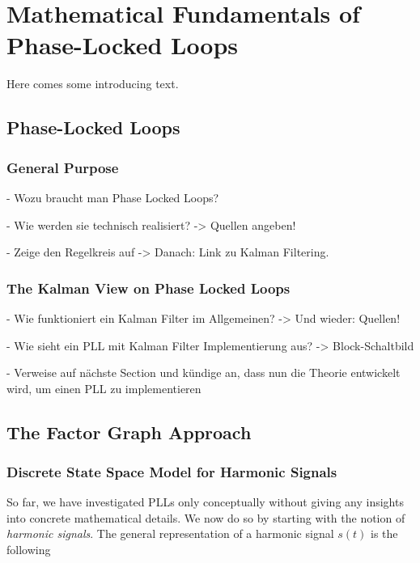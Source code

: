 \chapter{Mathematical Fundamentals of Phase-Locked Loops}

Here comes some introducing text.

\section{Phase-Locked Loops}

\subsection{General Purpose}

- Wozu braucht man Phase Locked Loops?

\noindent - Wie werden sie technisch realisiert? -> Quellen angeben!

\noindent - Zeige den Regelkreis auf -> Danach: Link zu Kalman Filtering.

\subsection{The Kalman View on Phase Locked Loops}

- Wie funktioniert ein Kalman Filter im Allgemeinen? -> Und wieder: Quellen!

\noindent - Wie sieht ein PLL mit Kalman Filter Implementierung aus? -> Block-Schaltbild

\noindent - Verweise auf nächste Section und kündige an, dass nun die Theorie entwickelt wird, um einen PLL zu implementieren


\section{The Factor Graph Approach}

\subsection{Discrete State Space Model for Harmonic Signals}

So far, we have investigated PLLs only conceptually without giving any insights into concrete mathematical details. We now do so by starting with the notion of \emph{harmonic signals}. The general representation of a harmonic signal $s(t)$ is the following \cite{somethingToCite}

